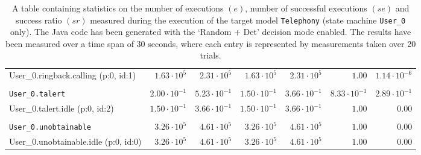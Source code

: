 \begin{table}[htbp]
{\begin{tabular}{lrrrrrr}
\hspace{3mm}User\_0.ringback.calling (p:0, id:1)     &  $1.63 \cdot 10^{5}$ &  $2.31 \cdot 10^{5}$ &  $1.63 \cdot 10^{5}$ &  $2.31 \cdot 10^{5}$ &               $1.00$ & $1.14 \cdot 10^{-6}$ \\
\\[-8pt]\texttt{User\_0.talert}                      & $2.00 \cdot 10^{-1}$ & $5.23 \cdot 10^{-1}$ & $1.50 \cdot 10^{-1}$ & $3.66 \cdot 10^{-1}$ & $8.33 \cdot 10^{-1}$ & $2.89 \cdot 10^{-1}$ \\
\hspace{3mm}User\_0.talert.idle (p:0, id:2)          & $1.50 \cdot 10^{-1}$ & $3.66 \cdot 10^{-1}$ & $1.50 \cdot 10^{-1}$ & $3.66 \cdot 10^{-1}$ &               $1.00$ &               $0.00$ \\
\\[-8pt]\texttt{User\_0.unobtainable}                &  $3.26 \cdot 10^{5}$ &  $4.61 \cdot 10^{5}$ &  $3.26 \cdot 10^{5}$ &  $4.61 \cdot 10^{5}$ &               $1.00$ &               $0.00$ \\
\hspace{3mm}User\_0.unobtainable.idle (p:0, id:0)    &  $3.26 \cdot 10^{5}$ &  $4.61 \cdot 10^{5}$ &  $3.26 \cdot 10^{5}$ &  $4.61 \cdot 10^{5}$ &               $1.00$ &               $0.00$ \\
\bottomrule
\end{tabular}
}
\caption{A table containing statistics on the number of executions $(e)$, number of successful executions $(se)$ and success ratio $(sr)$ measured during the execution of the target model \texttt{Telephony} (state machine \texttt{User\_0} only). The Java code has been generated with the `Random + Det' decision mode enabled. The results have been measured over a time span of 30 seconds, where each entry is represented by measurements taken over 20 trials.}
\label{table:frequency_results_telephony_random_det_user_0}
\end{table}